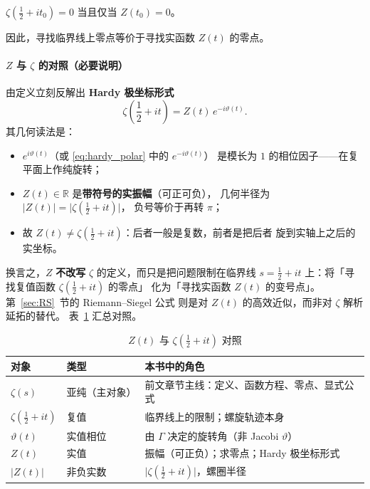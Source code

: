 \begin{corollary}{}{}
$\zeta(\frac12+it_0)=0$ 当且仅当 $Z(t_0)=0$。
\end{corollary}
因此，寻找临界线上零点等价于寻找实函数 $Z(t)$ 的零点。

\paragraph{$Z$ 与 $\zeta$ 的对照（必要说明）}
由定义立刻反解出 \textbf{Hardy 极坐标形式}
\begin{equation}
  \zeta\!\left(\frac12+it\right)
  =
  Z(t)\,e^{-i\vartheta(t)}.
  \label{eq:hardy_polar}
\end{equation}
其几何读法是：
\begin{itemize}
  \item $e^{i\vartheta(t)}$（或 \eqref{eq:hardy_polar} 中的 $e^{-i\vartheta(t)}$）
        是模长为 $1$ 的相位因子——在复平面上作纯旋转；
  \item $Z(t)\in\mathbb{R}$ 是\textbf{带符号的实振幅}（可正可负），
        几何半径为 $|Z(t)|=\bigl|\zeta(\frac12+it)\bigr|$，
        负号等价于再转 $\pi$；
  \item 故 $Z(t)\neq\zeta(\frac12+it)$：后者一般是复数，前者是把后者
        旋到实轴上之后的实坐标。
\end{itemize}
换言之，$Z$ \textbf{不改写} $\zeta$ 的定义，而只是把问题限制在临界线
$s=\frac12+it$ 上：将「寻找复值函数 $\zeta(\frac12+it)$ 的零点」
化为「寻找实函数 $Z(t)$ 的变号点」。
第~\ref{sec:RS}~节的 Riemann--Siegel 公式
则是对 $Z(t)$ 的高效近似，而非对 $\zeta$ 解析延拓的替代。
表~\ref{tab:Z_vs_zeta} 汇总对照。

\begin{table}[htbp]
\centering
\caption{$Z(t)$ 与 $\zeta(\frac12+it)$ 对照}
\label{tab:Z_vs_zeta}
\begin{tabular}{@{}lll@{}}
\toprule
对象 & 类型 & 本书中的角色 \\
\midrule
$\zeta(s)$ & 亚纯（主对象） & 前文章节主线：定义、函数方程、零点、显式公式 \\
$\zeta(\frac12+it)$ & 复值 & 临界线上的限制；螺旋轨迹本身 \\
$\vartheta(t)$ & 实值相位 & 由 $\Gamma$ 决定的旋转角（非 Jacobi $\vartheta$） \\
$Z(t)$ & 实值 & 振幅（可正负）；求零点；Hardy 极坐标形式 \\
$|Z(t)|$ & 非负实数 & $\bigl|\zeta(\frac12+it)\bigr|$，螺圈半径 \\
\bottomrule
\end{tabular}
\end{table}

